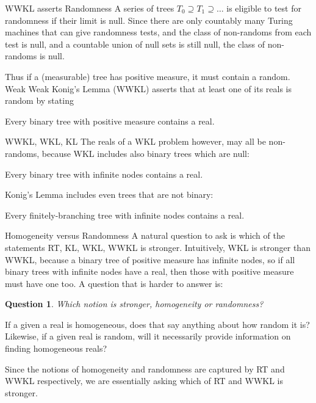 \begin{frame}{WWKL asserts Randomness}
  A series of trees $T_0\supseteq T_1\supseteq\ldots$ is eligible to
  test for randomness if their limit is null. Since there are
  only countably many Turing machines that can give randomness tests,
  and the class of non-randoms from each test is null, and
  a countable union of null sets is still null, the class of non-randoms
  is null.

  \vspace{2em}
  Thus if a (measurable) tree has positive measure, it must contain a
  random. Weak Weak Konig's Lemma (WWKL) asserts that at least one of its
  reals is random by stating
  \begin{thm*}
    Every binary tree with positive measure contains a real.
  \end{thm*}
\end{frame}

\begin{frame}{WWKL, WKL, KL}
  The reals of a WKL problem however, may all be non-randoms, because WKL
  includes also binary trees which are null:
  \begin{thm*}
    Every binary tree with infinite nodes contains a real.
  \end{thm*}

  \vspace{2em}
  Konig's Lemma includes even trees that are not binary:
  \begin{thm*}
    Every finitely-branching tree with infinite nodes contains a real.
  \end{thm*}
\end{frame}

\begin{frame}{Homogeneity versus Randomness}
  A natural question to ask is which of the statements RT, KL, WKL, WWKL is
  stronger. Intuitively, WKL is stronger than WWKL, because a binary tree
  of positive measure has infinite nodes, so if all binary trees with
  infinite nodes have a real, then those with positive measure must
  have one too. A question that is harder to answer is:
  \newtheorem*{question*}{Question}
  \begin{question*}
    Which notion is stronger, homogeneity or randomness?
  \end{question*}
  If a given a real is homogeneous, does that say anything about how random
  it is? Likewise, if a given real is random, will it necessarily provide
  information on finding homogeneous reals?

  \vspace{0.5em}
  Since the notions of homogeneity and randomness are captured by RT and
  WWKL respectively, we are essentially asking which of RT and WWKL is
  stronger.
\end{frame}

